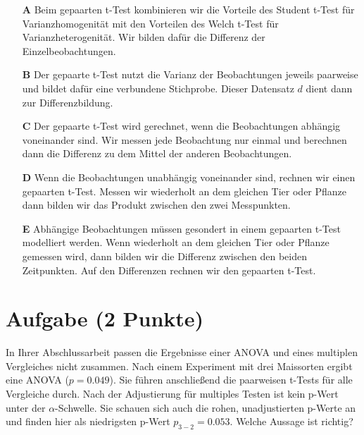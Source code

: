 \documentclass[a4paper, 9pt]{scrartcl}\usepackage[]{graphicx}\usepackage[]{xcolor}
\begin{document}
\begin{enumerate}
\item [\textbf{A} \msquare] Beim gepaarten t-Test kombinieren wir die Vorteile des Student t-Test für Varianzhomogenität mit den Vorteilen des Welch t-Test für Varianzheterogenität. Wir bilden dafür die Differenz der Einzelbeobachtungen.
\item [\textbf{B} \msquare] Der gepaarte t-Test nutzt die Varianz der Beobachtungen jeweils paarweise und bildet dafür eine verbundene Stichprobe. Dieser Datensatz $d$ dient dann zur Differenzbildung.
\item [\textbf{C} \msquare] Der gepaarte t-Test wird gerechnet, wenn die Beobachtungen abhängig voneinander sind. Wir messen jede Beobachtung nur einmal und berechnen dann die Differenz zu dem Mittel der anderen Beobachtungen.
\item [\textbf{D} \msquare] Wenn die Beobachtungen unabhängig voneinander sind, rechnen wir einen gepaarten t-Test. Messen wir wiederholt an dem gleichen Tier oder Pflanze dann bilden wir das Produkt zwischen den zwei Messpunkten.
\item [\textbf{E} \msquare] Abhängige Beobachtungen müssen gesondert in einem gepaarten t-Test modelliert werden. Wenn wiederholt an dem gleichen Tier oder Pflanze gemessen wird, dann bilden wir die Differenz zwischen den beiden Zeitpunkten. Auf den Differenzen rechnen wir den gepaarten t-Test.
\end{enumerate}

\section{Aufgabe \hfill (2 Punkte)}



In Ihrer Abschlussarbeit passen die Ergebnisse einer ANOVA und eines multiplen Vergleiches nicht zusammen. Nach einem Experiment mit drei Maissorten ergibt eine ANOVA ($p = 0.049$). Sie führen anschließend die paarweisen t-Tests für alle Vergleiche durch. Nach der Adjustierung für multiples Testen ist kein p-Wert unter der $\alpha$-Schwelle. Sie schauen sich auch die rohen, unadjustierten p-Werte an und finden hier als niedrigsten p-Wert $p_{3-2} = 0.053$. Welche Aussage ist richtig?
\end{document}
